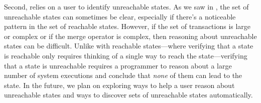 Second,  relies on a user to identify
unreachable states. As we saw in , the set of
unreachable states can sometimes be clear, especially if there's a noticeable
pattern in the set of reachable states. However, if the set of transactions is
large or complex or if the merge operator is complex, then reasoning about
unreachable states can be difficult.  Unlike with reachable states---where
verifying that a state is reachable only requires thinking of a single way to
reach the state---verifying that a state is unreachable requires a programmer
to reason about a large number of system executions and conclude that
\emph{none} of them can lead to the state. In the future, we plan on exploring
ways to help a user reason about unreachable states and ways to discover sets of
unreachable states automatically.

